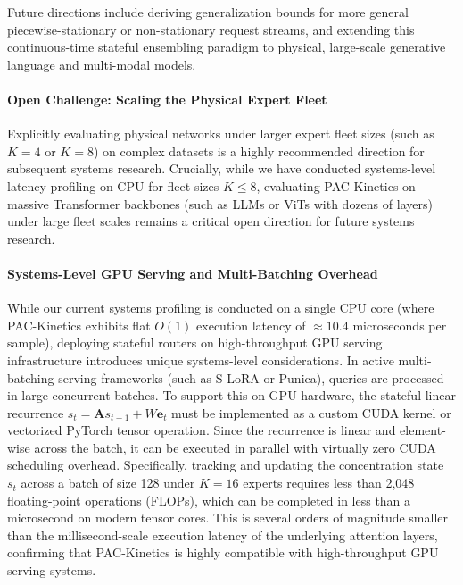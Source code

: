 Future directions include deriving generalization bounds for more general piecewise-stationary or non-stationary request streams, and extending this continuous-time stateful ensembling paradigm to physical, large-scale generative language and multi-modal models. 

\paragraph{Open Challenge: Scaling the Physical Expert Fleet} Explicitly evaluating physical networks under larger expert fleet sizes (such as $K=4$ or $K=8$) on complex datasets is a highly recommended direction for subsequent systems research. Crucially, while we have conducted systems-level latency profiling on CPU for fleet sizes $K \le 8$, evaluating PAC-Kinetics on massive Transformer backbones (such as LLMs or ViTs with dozens of layers) under large fleet scales remains a critical open direction for future systems research.

\paragraph{Systems-Level GPU Serving and Multi-Batching Overhead} While our current systems profiling is conducted on a single CPU core (where PAC-Kinetics exhibits flat $O(1)$ execution latency of $\approx 10.4$ microseconds per sample), deploying stateful routers on high-throughput GPU serving infrastructure introduces unique systems-level considerations. In active multi-batching serving frameworks (such as S-LoRA or Punica), queries are processed in large concurrent batches. To support this on GPU hardware, the stateful linear recurrence $s_t = \mathbf{A} s_{t-1} + W \mathbf{e}_t$ must be implemented as a custom CUDA kernel or vectorized PyTorch tensor operation. Since the recurrence is linear and element-wise across the batch, it can be executed in parallel with virtually zero CUDA scheduling overhead. Specifically, tracking and updating the concentration state $s_t$ across a batch of size 128 under $K=16$ experts requires less than 2,048 floating-point operations (FLOPs), which can be completed in less than a microsecond on modern tensor cores. This is several orders of magnitude smaller than the millisecond-scale execution latency of the underlying attention layers, confirming that PAC-Kinetics is highly compatible with high-throughput GPU serving systems.

